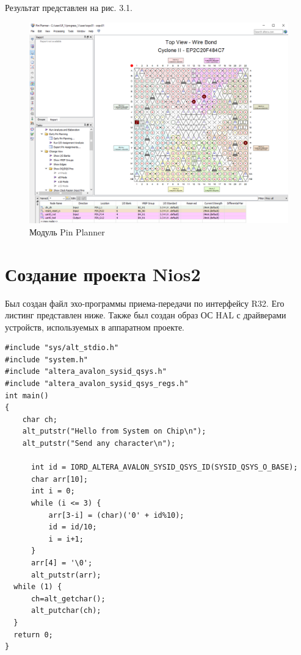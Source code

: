 Результат представлен на рис. 3.1.
\begin{figure}[H]
	\begin{center}
		\includegraphics[scale=0.5]{assets/pin_planner.png}
	\end{center}
	\caption{Модуль Pin Planner}
\end{figure}

\chapter{Создание проекта Nios2}

Был создан файл эхо-программы приема-передачи по интерфейсу R32. Его листинг представлен ниже. Также был создан образ ОС HAL с драйверами устройств, используемых в аппаратном проекте.

\captionsetup{singlelinecheck = false, justification=raggedright}
\begin{lstlisting}[label=code, caption=Код рассматриваемой программы]
#include "sys/alt_stdio.h"
#include "system.h"
#include "altera_avalon_sysid_qsys.h"
#include "altera_avalon_sysid_qsys_regs.h"
int main()
{ 
	char ch;
	alt_putstr("Hello from System on Chip\n");
	alt_putstr("Send any character\n");

	  int id = IORD_ALTERA_AVALON_SYSID_QSYS_ID(SYSID_QSYS_O_BASE);
  	  char arr[10];
  	  int i = 0;
  	  while (i <= 3) {
  		  arr[3-i] = (char)('0' + id%10);
  		  id = id/10;
  		  i = i+1;
  	  }
  	  arr[4] = '\0';
  	  alt_putstr(arr);
  while (1) {
	  ch=alt_getchar();
	  alt_putchar(ch);
  }
  return 0;
}
\end{lstlisting}
\captionsetup{singlelinecheck = false, justification=centering}


